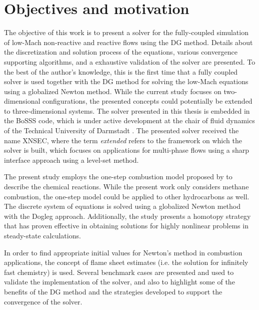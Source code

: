 \section{Objectives and motivation}
The objective of this work is to present a solver for the fully-coupled simulation of low-Mach non-reactive and reactive flows using the \gls{DG} method. Details about the discretization and solution process of the equations, various convergence supporting algorithms, and a exhaustive validation of the solver are presented. To the best of the author's knowledge, this is the first time that a fully coupled solver is used together with the DG method for solving the low-Mach equations using a globalized Newton method. While the current study focuses on two-dimensional configurations, the presented concepts could potentially be extended to three-dimensional systems. The solver presented in this thesis is embedded in the \gls{BoSSS} code, which is under active development at the chair of fluid dynamics of the Technical University of Darmstadt \footnotemark.
The presented solver received the name \gls{XNSEC}, where the term \textit{extended} refers to the framework on which the solver is built, which focuses on applications for multi-phase flows using a sharp interface approach using a level-set method. 

The present study employs the one-step combustion model proposed by \textcite{fernandez-tarrazoSimpleOnestepChemistry2006} to describe the chemical reactions. While the present work only considers methane combustion, the one-step model could be applied to other hydrocarbons as well. The discrete system of equations is solved using a globalized Newton method with the Dogleg approach. Additionally, the study presents a homotopy strategy that has proven effective in obtaining solutions for highly nonlinear problems in steady-state calculations.

In order to find appropriate initial values for Newton's method in combustion applications, the concept of flame sheet estimates (i.e. the solution for infinitely fast chemistry) is used. Several benchmark cases are presented and used to validate the implementation of the solver, and also to highlight  some of the benefits of the DG method and the strategies developed to support the convergence of the solver. 

